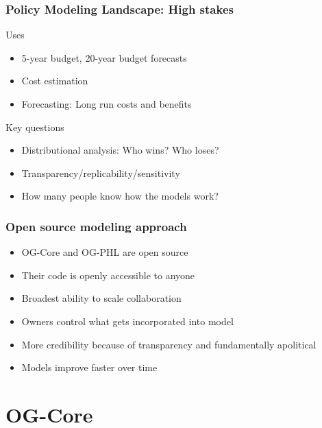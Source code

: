 \documentclass{beamer}
\begin{document}
  \begin{frame}
    \frametitle{Policy Modeling Landscape: High stakes}
    Uses
    \begin{itemize}
      \item 5-year budget, 20-year budget forecasts
      \item Cost estimation
      \item Forecasting: Long run costs and benefits
    \end{itemize}
    \vspace{5mm}
    \begin{alertblock}{Key questions}
      \begin{itemize}
        \item Distributional analysis: Who wins? Who loses?
        \item Transparency/replicability/sensitivity
        \item How many people know how the models work?
      \end{itemize}
    \end{alertblock}
  \end{frame}

  \begin{frame}
    \frametitle{Open source modeling approach}
    \begin{itemize}
      \item OG-Core and OG-PHL are open source
      \vspace{3mm}
      \item Their code is openly accessible to anyone
      \vspace{3mm}
      \item Broadest ability to scale collaboration
      \vspace{3mm}
      \item Owners control what gets incorporated into model
      \vspace{3mm}
      \item More credibility because of transparency and fundamentally apolitical
      \vspace{3mm}
      \item Models improve faster over time
    \end{itemize}
  \end{frame}


\section{OG-Core}
\end{document}
